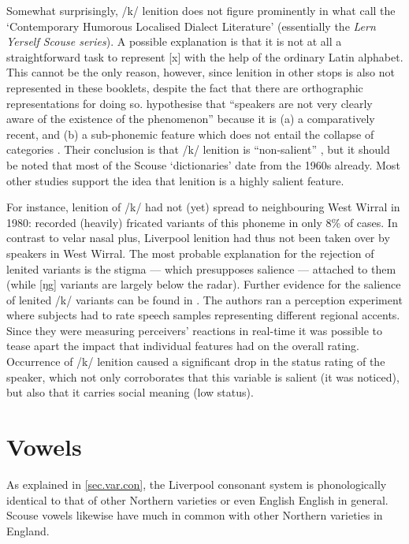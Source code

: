 Somewhat surprisingly, /k/ lenition does not figure prominently in what \citeauthor{honeybonewatson2013} call the `Contemporary Humorous Localised Dialect Literature' (essentially the \emph{Lern Yerself Scouse series}).
A possible explanation is that it is not at all a straightforward task to represent [x] with the help of the ordinary Latin alphabet.
This cannot be the only reason, however, since lenition in other stops is also not represented in these booklets, despite the fact that there are orthographic representations for doing so.
\citeauthor{honeybonewatson2013} hypothesise that ``speakers are not very clearly aware of the existence of the phenomenon'' because it is (a) a comparatively recent, and (b) a sub-phonemic feature which does not entail the collapse of categories \parencite[cf.][329--331]{honeybonewatson2013}.
Their conclusion is that /k/ lenition is ``non-salient'' \parencite[333]{honeybonewatson2013}, but it should be noted that most of the Scouse `dictionaries' date from the 1960s already.
Most other studies support the idea that lenition is a highly salient feature.

For instance, lenition of /k/ had not (yet) spread to neighbouring West Wirral in 1980: \textcite[cf.][97]{newbrook1999} recorded (heavily) fricated variants of this phoneme in only 8\% of cases.
In contrast to velar nasal plus, Liverpool lenition had thus not been taken over by speakers in West Wirral.
The most probable explanation for the rejection of lenited variants is the stigma --- which presupposes salience --- attached to them (while [ŋg] variants are largely below the radar).
Further evidence for the salience of lenited /k/ variants can be found in \citealt{watsonclark2015}.
The authors ran a perception experiment where subjects had to rate speech samples representing different regional accents.
Since they were measuring perceivers' reactions in real-time it was possible to tease apart the impact that individual features had on the overall rating.
Occurrence of /k/ lenition caused a significant drop in the status rating of the speaker, which not only corroborates that this variable is salient (it was noticed), but also that it carries social meaning (low status).

	\section{Vowels}\label{sec.var.vow}

As explained in \ref{sec.var.con}, the Liverpool consonant system is phonologically identical to that of other Northern varieties or even English English in general.
Scouse vowels likewise have much in common with other Northern varieties in England.

